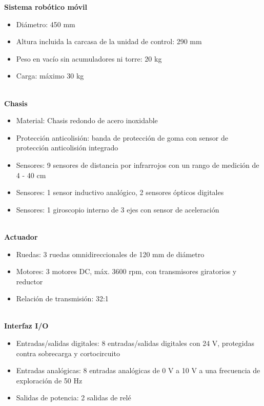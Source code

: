             \textbf{Sistema robótico móvil}
            \begin{itemize}
                \item Diámetro: 450 mm
                \item Altura incluida la carcasa de la unidad de control: 290 mm
                \item Peso en vacío sin acumuladores ni torre: 20 kg
                \item Carga: máximo 30 kg
            \end{itemize}
            
            \phantom{saltodelineaforzado >:D}\\
            
            \textbf{Chasis}
            \begin{itemize}
                \item Material: Chasis redondo de acero inoxidable
                \item Protección anticolisión: banda de protección de goma con sensor de protección anticolisión integrado
                \item Sensores: 9 sensores de distancia por infrarrojos con un rango de medición de 4 - 40 cm
                \item Sensores: 1 sensor inductivo analógico, 2 sensores ópticos digitales
                \item Sensores: 1 giroscopio interno de 3 ejes con sensor de aceleración
            \end{itemize}

            \phantom{saltodelineaforzado >:D}\\
            
            \textbf{Actuador}
            \begin{itemize}
                \item Ruedas: 3 ruedas omnidireccionales de 120 mm de diámetro
                \item Motores: 3 motores DC, máx. 3600 rpm, con transmisores giratorios y reductor
                \item Relación de transmisión: 32:1
            \end{itemize}

            \phantom{saltodelineaforzado >:D}\\
            
            \textbf{Interfaz I/O}
            \begin{itemize}
                \item Entradas/salidas digitales: 8 entradas/salidas digitales con 24 V, protegidas contra sobrecarga y cortocircuito
                \item Entradas analógicas: 8 entradas analógicas de 0 V a 10 V a una frecuencia de exploración de 50 Hz
                \item Salidas de potencia: 2 salidas de relé
            \end{itemize}

